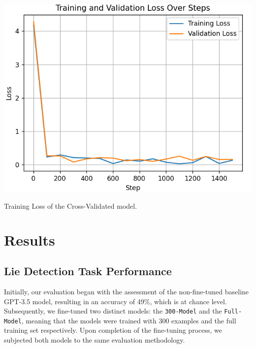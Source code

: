 \documentclass[10pt,twocolumn,letterpaper]{article}
\begin{document}
\begin{center}
\includegraphics*[scale=0.55]{img/training_loss_full.png}
\end{center} 

\begin{center}
    \small {Training Loss of the Cross-Validated model.} 
\end{center}

\section{Results}

\subsection{Lie Detection Task Performance}

Initially, our evaluation began with the assessment of the non-fine-tuned
baseline GPT-3.5 model, resulting in an accuracy of 49\%, which is at chance level. Subsequently,
we fine-tuned two distinct models: the \texttt{300-Model} and the \texttt{Full-Model}, meaning
that the models were trained with 300 examples and the full training set respectively.
Upon completion of the fine-tuning process, we subjected both models to the same evaluation methodology. \\
\end{document}
